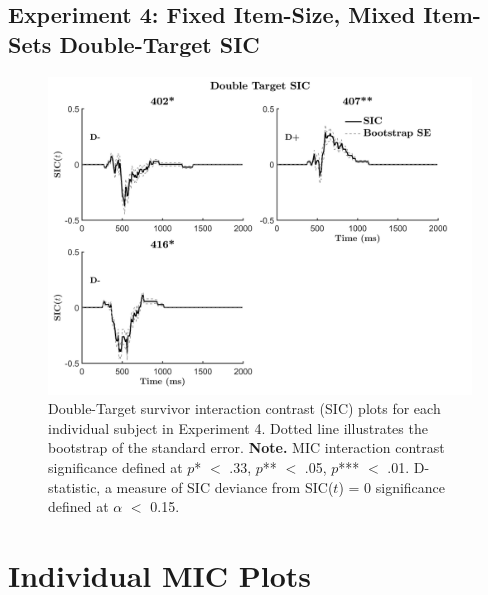 \subsection{Experiment 4: Fixed Item-Size, Mixed Item-Sets Double-Target SIC}
\begin{figure}[htb]
\begin{center}
\includegraphics[width=\linewidth]{Figures/Appendix/FIG26PNG.png}
\caption{Double-Target survivor interaction contrast (SIC) plots for each individual subject in Experiment 4. Dotted line illustrates the bootstrap of the standard error.\newline
\textbf{Note.} MIC interaction contrast significance defined at $p$* $<$ .33, $p$** $<$ .05, $p$*** $<$ .01. D-statistic, a measure of SIC deviance from SIC($t$) = 0 significance defined at $\alpha$ $<$ 0.15.}
\label{fig:Indiv_SIC_AB_Ex4}
\end{center}
\end{figure}
\newpage


\section{Individual MIC Plots}
\label{Sup: IndMIC}


